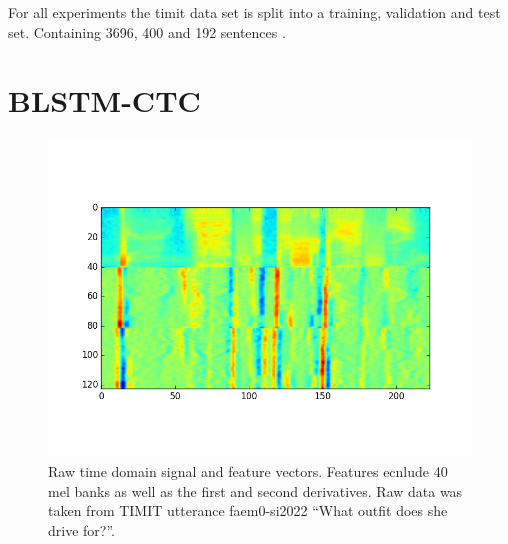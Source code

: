 For all experiments the timit data set is split into a training, validation and test set. Containing 3696, 400 and 192 sentences \cite[page  80]{Graves2012}.


\section{BLSTM-CTC}
\begin{figure}
\centering

\includegraphics[width=0.49\linewidth]{png/feats_faem0_si2022.png}
\caption{Raw time domain signal and feature vectors. Features ecnlude 40 mel banks as well as the first and second derivatives. Raw data was taken from TIMIT utterance faem0-si2022 \enquote{What outfit does she drive for?}.}
\label{fig:timitFeats}
\end{figure}

